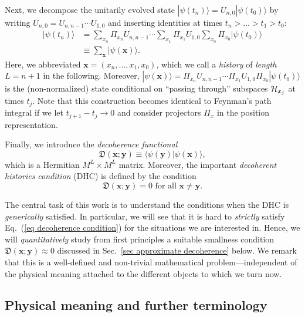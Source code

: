 \documentclass[pre,onecolumn,12pt,aps,longbibliography,nofootinbib]{revtex4-2}
\newcommand{\C}[1]{{\cal{#1}}}
\newcommand{\bb}[1]{\textbf{#1}}
\newcommand{\mf}[1]{{\mathfrak{#1}}}
\newcommand{\lr}[1]{{\langle {#1}\rangle}}
\newcommand{\new}[1]{#1}
\begin{document}
Next, we decompose the unitarily evolved state $|\psi(t_n)\rangle = U_{n,0}|\psi(t_0)\rangle$ by writing $U_{n,0} = U_{n,n-1}\cdots U_{1,0}$ and inserting identities at times $t_n > \dots > t_1 > t_0$:
\begin{align}
 |\psi(t_n)\rangle
 &= \sum_{x_n}\Pi_{x_n} U_{n,n-1}\cdots\sum_{x_1}\Pi_{x_1}U_{1,0}\sum_{x_0}\Pi_{x_0}|\psi(t_0)\rangle \nonumber \\
 &\equiv \sum_{\bb x}|\psi(\bb x)\rangle. \label{eq psi tot}
\end{align}
Here, we abbreviated $\bb x = (x_n,\dots,x_1,x_0)$, which we call a \emph{history} of \emph{length} $L=n+1$ in the following. Moreover, $|\psi(\bb x)\rangle = \Pi_{x_n} U_{n,n-1}\cdots\Pi_{x_1}U_{1,0}\Pi_{x_0}|\psi(t_0)\rangle$ is the (non-normalized) state conditional on ``passing through'' subspaces $\C H_{x_j}$ at times $t_j$. Note that this construction becomes identical to Feynman's path integral if we let $t_{j+1}-t_j\rightarrow0$ and consider projectors $\Pi_x$ in the position representation.

Finally, we introduce the \emph{decoherence functional}
\begin{equation}\label{eq decoherence functional}
 \mf{D}(\bb x;\bb y) \equiv \lr{\psi(\bb y)|\psi(\bb x)},
\end{equation}
which is a Hermitian $M^L\times M^L$ matrix. Moreover, the important \emph{decoherent histories condition} (DHC) is defined by the condition
\begin{equation}\label{eq decoherence condition}
 \mf{D}(\bb x;\bb y) = 0 \text{ for all } \bb x\neq\bb y.
\end{equation}

The central task of this work is to understand the conditions when the DHC is \emph{generically} satisfied. In particular, we will see that it is hard to \emph{strictly} satisfy Eq.~(\ref{eq decoherence condition}) for the situations we are interested in. Hence, we will \emph{quantitatively} study from first principles a suitable smallness condition $\mf{D}(\bb x;\bb y) \approx 0$ discussed in Sec.~\ref{sec approximate decoherence} below. We remark that this is a well-defined and non-trivial mathematical problem---independent of the physical meaning attached to the different objects to which we turn now.

\subsection{\new{Physical meaning and further terminology}}
\end{document}
